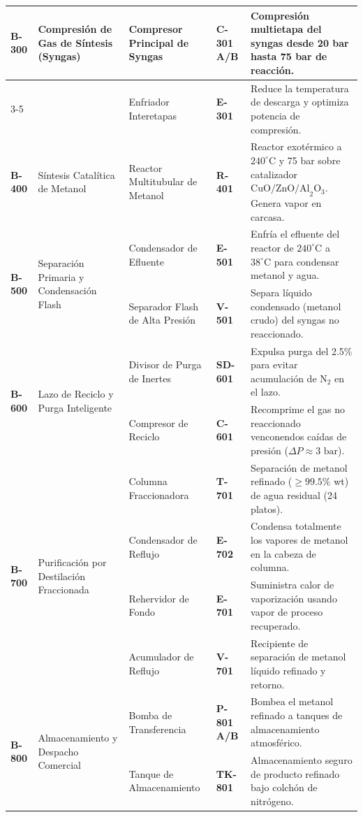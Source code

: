 \documentclass[11pt,letterpaper]{article}
\newcommand{\tagbox}[1]{\textbf{\color{SolvantaNavy}#1}}
\begin{document}
\begin{longtable}{|p{1.4cm}|p{3.2cm}|p{3.0cm}|p{1.6cm}|p{4.8cm}|}
    \multirow{2}{*}{\textbf{B-300}} & \multirow{2}{=}{Compresión de Gas de Síntesis (Syngas)} & Compresor Principal de Syngas & \tagbox{C-301 A/B} & Compresión multietapa del syngas desde 20 bar hasta 75 bar de reacción. \\ \cline{3-5}
     & & Enfriador Interetapas & \tagbox{E-301} & Reduce la temperatura de descarga y optimiza potencia de compresión. \\ \hline

    \textbf{B-400} & Síntesis Catalítica de Metanol & Reactor Multitubular de Metanol & \tagbox{R-401} & Reactor exotérmico a $240^\circ\text{C}$ y 75 bar sobre catalizador $\text{CuO/ZnO/Al}_2\text{O}_3$. Genera vapor en carcasa. \\ \hline

    \multirow{2}{*}{\textbf{B-500}} & \multirow{2}{=}{Separación Primaria y Condensación Flash} & Condensador de Efluente & \tagbox{E-501} & Enfría el efluente del reactor de $240^\circ\text{C}$ a $38^\circ\text{C}$ para condensar metanol y agua. \\ \cline{3-5}
     & & Separador Flash de Alta Presión & \tagbox{V-501} & Separa líquido condensado (metanol crudo) del syngas no reaccionado. \\ \hline

    \multirow{2}{*}{\textbf{B-600}} & \multirow{2}{=}{Lazo de Reciclo y Purga Inteligente} & Divisor de Purga de Inertes & \tagbox{SD-601} & Expulsa purga del 2.5\% para evitar acumulación de $\text{N}_2$ en el lazo. \\ \cline{3-5}
     & & Compresor de Reciclo & \tagbox{C-601} & Recomprime el gas no reaccionado venconendos caídas de presión ($\Delta P \approx 3\text{ bar}$). \\ \hline

    \multirow{4}{*}{\textbf{B-700}} & \multirow{4}{=}{Purificación por Destilación Fraccionada} & Columna Fraccionadora & \tagbox{T-701} & Separación de metanol refinado ($\ge 99.5\%$ wt) de agua residual (24 platos). \\ \cline{3-5}
     & & Condensador de Reflujo & \tagbox{E-702} & Condensa totalmente los vapores de metanol en la cabeza de columna. \\ \cline{3-5}
     & & Rehervidor de Fondo & \tagbox{E-701} & Suministra calor de vaporización usando vapor de proceso recuperado. \\ \cline{3-5}
     & & Acumulador de Reflujo & \tagbox{V-701} & Recipiente de separación de metanol líquido refinado y retorno. \\ \hline

    \multirow{2}{*}{\textbf{B-800}} & \multirow{2}{=}{Almacenamiento y Despacho Comercial} & Bomba de Transferencia & \tagbox{P-801 A/B} & Bombea el metanol refinado a tanques de almacenamiento atmosférico. \\ \cline{3-5}
     & & Tanque de Almacenamiento & \tagbox{TK-801} & Almacenamiento seguro de producto refinado bajo colchón de nitrógeno. \\ \hline
\end{longtable}
\end{document}
